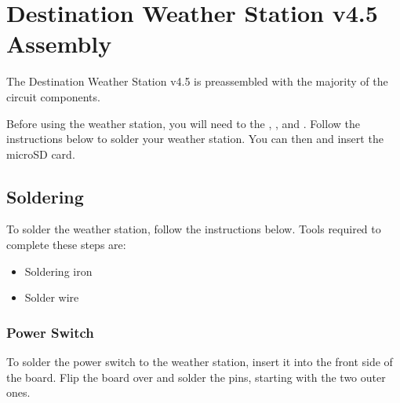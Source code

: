 \documentclass[letterpaper,10pt,english]{sphinxmanual}
\begin{document}
\sphinxstepscope


\section{Destination Weather Station v4.5 Assembly}
\label{\detokenize{hardware/assembly:destination-weather-station-v4-5-assembly}}\label{\detokenize{hardware/assembly:assembly}}\label{\detokenize{hardware/assembly::doc}}
\sphinxAtStartPar
The Destination Weather Station v4.5 is preassembled with the majority of the circuit components.

\sphinxAtStartPar
Before using the weather station, you will need to {\hyperref[\detokenize{hardware/assembly:id1}]{}} the {\hyperref[\detokenize{hardware/assembly:id2}]{}}, {\hyperref[\detokenize{hardware/assembly:id3}]{}}, and . Follow the instructions below to solder your weather station. You can then {\hyperref[\detokenize{hardware/assembly:id4}]{}} and insert the microSD card.


\subsection{Soldering}
\label{\detokenize{hardware/assembly:soldering}}\label{\detokenize{hardware/assembly:id1}}
\sphinxAtStartPar
To solder the weather station, follow the instructions below. Tools required to complete these steps are:
\begin{itemize}
\item {} 
\sphinxAtStartPar
Soldering iron

\item {} 
\sphinxAtStartPar
Solder wire

\end{itemize}


\subsubsection{Power Switch}
\label{\detokenize{hardware/assembly:power-switch}}\label{\detokenize{hardware/assembly:switch}}\label{\detokenize{hardware/assembly:switch}}

\sphinxAtStartPar
To solder the power switch to the weather station, insert it into the front side of the board. Flip the board over and solder the pins, starting with the two outer ones.
\end{document}
